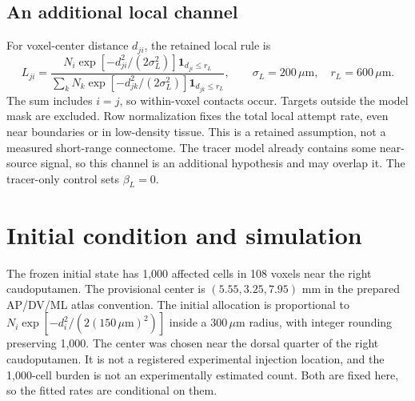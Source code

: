 \documentclass[10pt]{article}
\newcommand{\um}{\,\mu\mathrm{m}}\newcommand{\E}{\mathbb{E}}
\begin{document}
\subsection{An additional local channel}
For voxel-center distance $d_{ji}$, the retained local rule is
\begin{equation}
 L_{ji}=\frac{N_i\exp[-d_{ji}^2/(2\sigma_L^2)]\mathbf{1}_{d_{ji}\leq r_L}}
 {\sum_kN_k\exp[-d_{jk}^2/(2\sigma_L^2)]\mathbf{1}_{d_{jk}\leq r_L}},
 \qquad \sigma_L=200\um,\quad r_L=600\um.\label{eq:local}
\end{equation}
The sum includes $i=j$, so within-voxel contacts occur. Targets outside the model mask are excluded. Row normalization fixes the total local attempt rate, even near boundaries or in low-density tissue. This is a retained assumption, not a measured short-range connectome. The tracer model already contains some near-source signal, so this channel is an additional hypothesis and may overlap it. The tracer-only control sets $\beta_L=0$.

\newpage
\section{Initial condition and simulation}
The frozen initial state has 1,000 affected cells in 108 voxels near the right caudoputamen. The provisional center is $(5.55,3.25,7.95)$ mm in the prepared AP/DV/ML atlas convention. The initial allocation is proportional to $N_i\exp[-d_i^2/(2(150\um)^2)]$ inside a $300\um$ radius, with integer rounding preserving 1,000. The center was chosen near the dorsal quarter of the right caudoputamen. It is not a registered experimental injection location, and the 1,000-cell burden is not an experimentally estimated count. Both are fixed here, so the fitted rates are conditional on them.
\end{document}
